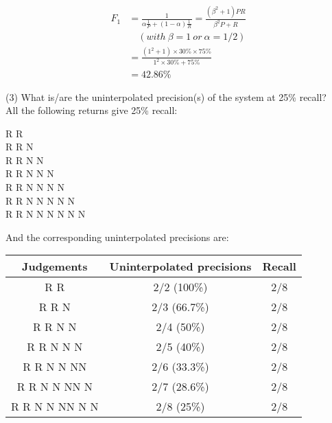 \documentclass[12pt, letterpaper, twoside]{article}
\begin{document}
\begin{enumerate}
        \begin{equation}
        \begin{split}
            F_1 & = \frac{1}{\alpha\frac{1}{P}+(1-\alpha)\frac{1}{R}}
             = \frac{(\beta^2+1)PR}{\beta^2P+R}\\
            &\quad (with\ \beta = 1\ or\ \alpha = 1/2)\\
            & = \frac{(1^2+1)\times 30\% \times 75\%}{1^2\times 30\% + 75\%}\\
            & = 42.86\%
        \end{split}
        \end{equation}

        (3) What is/are the uninterpolated precision(s) of the system at 25\% recall?\\
        All the following returns give 25\% recall:
        \begin{center}
            R R\\R R N\\R R N N\\R R N N N\\R R N N N \quad N\\R R N N N \quad N N\\R R N N N \quad N N N\\
        \end{center}
        And the corresponding uninterpolated precisions are:
        \begin{center}
        \begin{tabular}{||c | c | c||}
        \hline
         Judgements & Uninterpolated precisions & Recall \\ [0.5ex]
        \hline\hline
        R R & 2/2 (100\%) & 2/8\\
        \hline
        R R N & 2/3 (66.7\%)& 2/8\\
        \hline
        R R N N & 2/4 (50\%) & 2/8\\
        \hline
        R R N N N & 2/5 (40\%)& 2/8\\
        \hline
        R R N N N\quad N & 2/6 (33.3\%)& 2/8\\
        \hline
        R R N N N\quad N N & 2/7 (28.6\%)& 2/8\\
        \hline
        R R N N N\quad N N N & 2/8 (25\%)& 2/8\\
        \hline
        \end{tabular}
        \end{center}


\end{enumerate}
\end{document}
